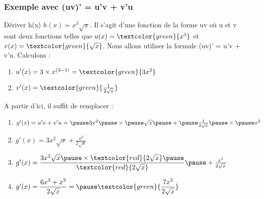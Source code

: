 \documentclass[t]{beamer}
\begin{document}
	\begin{frame}
		\frametitle{Exemple avec (uv)' = u'v + v'u}
		\pause
		\begin{block}{Dériver h(x)}
			$h(x) = x^3 \sqrt{x}$. \pause Il s'agit d'une fonction de la forme uv \pause où u et v sont deux fonctions \pause telles que $u(x) = \textcolor{green}{x^3}$ \pause et $v(x) = \textcolor{green}{\sqrt{x}}$. \pause Nous allons utiliser la formule (uv)' = u'v + v'u. \pause Calculons :
			\begin{enumerate}{}
				\item<+-> \(u'(x)= 3 \times x^{(3-1)} = \textcolor{green}{3x^2} \)
				\item<+-> \(v'(x) = \textcolor{green}{\frac{1}{2 \sqrt{x}}} \) 
			\end{enumerate}
			\pause
			A partir d'ici, il suffit de remplacer : \pause
			\begin{enumerate}[]
				\pause
				\item\(g'(x) = u'v + v'u = \pause 3x^2 \pause \times \pause \sqrt{x} \pause + \pause \frac{1}{2 \sqrt{x}} \pause \times \pause x^3\)
				\pause
				\item \(g'(x) = 3x^2 \sqrt{x} + \frac{x^3}{2 \sqrt{x}} \)
				\pause
				\item\(g'(x) = \dfrac{3x^2 \sqrt{x} \pause \times \textcolor{red}{2\sqrt{x}}\pause}{\textcolor{red}{2\sqrt{x}}} \pause + \frac{x^3}{2 \sqrt{x}} \)
				\pause
				\item \(g'(x) = \dfrac{6x^3 + x^3}{2\sqrt{x}} = \pause \textcolor{green}{\dfrac{7x^3}{2\sqrt{x}}} \)
			\end{enumerate}	
		\end{block}
	\end{frame}
\end{document}
